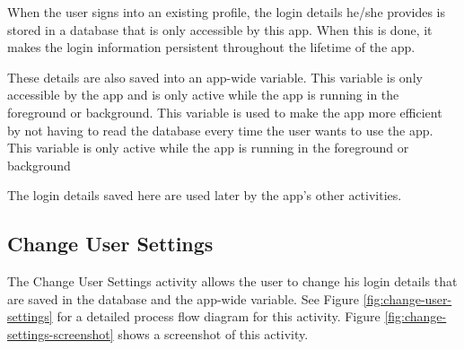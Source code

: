 When the user signs into an existing profile, the login details he/she provides
is stored in a database that is only accessible by this app. When this is done, it
makes the login information persistent throughout the lifetime of the app.

These details are also saved into an app-wide variable. This variable is
only accessible by the app and is only active while the app is running in
the foreground or background. This variable is used to make the app more
efficient by not having to read the database every time the user wants to use
the app. This variable is only active while the app is running in the foreground
or background

The login details saved here are used later by the app's other activities.

\subsection{Change User Settings}

The Change User Settings activity allows the user to change his login
details that are saved in the database and the app-wide variable. See Figure
\ref{fig:change-user-settings} for a detailed process flow diagram for this
activity. Figure \ref{fig:change-settings-screenshot} shows a screenshot of this
activity.

